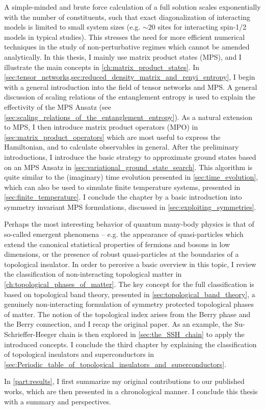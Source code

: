 A simple-minded and brute force calculation of a full solution scales exponentially with the number of constituents, such that exact diagonalization of interacting models is limited to small system sizes (e.g. $\sim 20$ sites for interacting spin-1/2 models in typical studies).
This stresses the need for more efficient numerical techniques in the study of non-perturbative regimes which cannot be amended analytically.
In this thesis, I mainly use matrix product states (MPS), and I illustrate the main concepts in \cref{ch:matrix_product_states}.
In \cref{sec:tensor_networks,sec:reduced_density_matrix_and_renyi_entropy}, I begin with a general introduction into the field of tensor networks and MPS.
A general discussion of scaling relations of the entanglement entropy is used to explain the effectivity of the MPS Ansatz (see \cref{sec:scaling_relations_of_the_entanglement_entropy}).
As a natural extension to MPS, I then introduce matrix product operators (MPO) in \cref{sec:matrix_product_operators} which are most useful to express the Hamiltonian, and to calculate observables in general.
After the preliminary introductions, I introduce the basic strategy to approximate ground states based on an MPS Ansatz in \cref{sec:variational_ground_state_search}.
This algorithm is quite similar to the (imaginary) time evolution presented in \cref{sec:time_evolution}, which can also be used to simulate finite temperature systems, presented in \cref{sec:finite_temperature}.
I conclude the chapter by a basic introduction into symmetry invariant MPS formulations, discussed in \cref{sec:exploiting_symmetries}.

Perhaps the most interesting behavior of quantum many-body physics is that of so-called emergent phenomena -- e.g. the appearance of quasi-particles which extend the canonical statistical properties of fermions and bosons in low dimensions, or the presence of robust quasi-particles at the boundaries of a topological insulator.
In order to perceive a basic overview in this topic, I review the classification of non-interacting topological matter in \cref{ch:topological_phases_of_matter}.
The key concept for the full classification is based on topological band theory, presented in \cref{sec:topological_band_theory}, a genuinely non-interacting formulation of symmetry protected topological phases of matter.
The notion of the topological index arises from the Berry phase and the Berry connection, and I recap the original paper.
As an example, the Su-Schrieffer-Heeger chain is then explored in \cref{sec:the_SSH_chain} to apply the introduced concepts.
I conclude the third chapter by explaining the classification of topological insulators and superconductors in \cref{sec:Periodic_table_of_topological_insulators_and_superconductors}.

In \cref{part:results}, I first summarize my original contributions to our published works, which are then presented in a chronological manner.
I conclude this thesis with a summary and perspectives.
